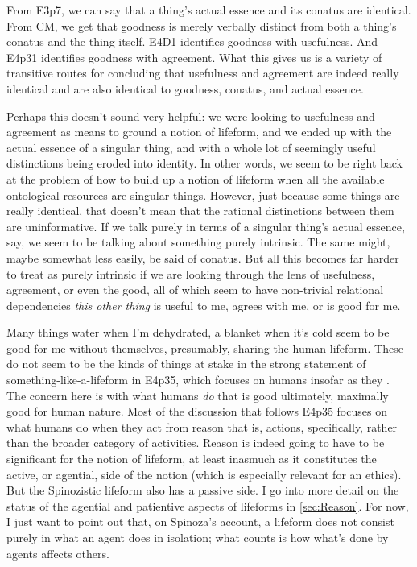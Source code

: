 \documentclass{article}
\newcommand{\dash}{\unskip{—}}
\begin{document}
From E3p7, we can say that a thing's actual essence and its conatus are identical. From CM, we get that goodness is merely verbally distinct from both a thing's conatus and the thing itself. E4D1 identifies goodness with usefulness. And E4p31 identifies goodness with agreement. What this gives us is a variety of transitive routes for concluding that usefulness and agreement are indeed really identical \dash and are also identical to goodness, conatus, and actual essence.

Perhaps this doesn't sound very helpful: we were looking to usefulness and agreement as means to ground a notion of lifeform, and we ended up with the actual essence of a singular thing, and with a whole lot of seemingly useful distinctions being eroded into identity. In other words, we seem to be right back at the problem of how to build up a notion of lifeform when all the available ontological resources are singular things. However, just because some things are really identical, that doesn't mean that the rational distinctions between them are uninformative. If we talk purely in terms of a singular thing's actual essence, say, we seem to be talking about something purely intrinsic. The same might, maybe somewhat less easily, be said of conatus. But all this becomes far harder to treat as purely intrinsic if we are looking through the lens of usefulness, agreement, or even the good, all of which seem to have non-trivial relational dependencies \dash \emph{this other thing} is useful to me, agrees with me, or is good for me.

Many things \dash water when I'm dehydrated, a blanket when it's cold \dash seem to be good for me without themselves, presumably, sharing the human lifeform. These do not seem to be the kinds of things at stake in the strong statement of something-like-a-lifeform in E4p35, which focuses on humans insofar as they . The concern here is with what humans \emph{do} that is good \dash ultimately, maximally good \dash for human nature. Most of the discussion that follows E4p35 focuses on what humans do when they act from reason \dash that is, actions, specifically, rather than the broader category of activities. Reason is indeed going to have to be significant for the notion of lifeform, at least inasmuch as it constitutes the active, or agential, side of the notion (which is especially relevant for an ethics). But the Spinozistic lifeform also has a passive side. I go into more detail on the status of the agential and patientive aspects of lifeforms in \cref{sec:Reason}. For now, I just want to point out that, on Spinoza's account, a lifeform does not consist purely in what an agent does in isolation; what counts is how what's done by agents affects others.
\end{document}
